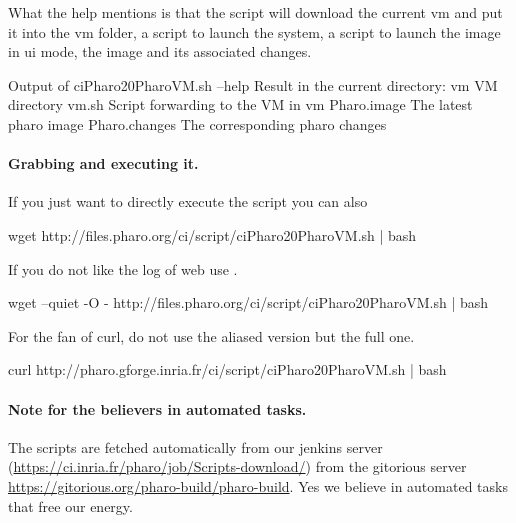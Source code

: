 \documentclass[a4paper,10pt,twoside]{book}
\begin{document}
What the help mentions is that the script will download the current vm and put it into the vm folder,  a script to launch the system, 
 a script to launch the image in ui mode, the image and its associated changes. 

\begin{code}{Output of ciPharo20PharoVM.sh --help }
Result in the current directory:
    vm                        VM directory
    vm.sh                   Script forwarding to the VM in vm
    Pharo.image        The latest pharo image
    Pharo.changes    The corresponding pharo changes
\end{code}


\paragraph{Grabbing and executing it.}
If you just want to directly execute the script you can also 


\begin{code}{}
wget http://files.pharo.org/ci/script/ciPharo20PharoVM.sh | bash
\end{code}

If you do not like the log of web use .

\begin{code}{}
wget --quiet -O - http://files.pharo.org/ci/script/ciPharo20PharoVM.sh | bash
\end{code}

For the fan of curl, do not use the aliased version but the full one.
\begin{code}{}
curl http://pharo.gforge.inria.fr/ci/script/ciPharo20PharoVM.sh | bash
\end{code}


\paragraph{Note for the believers in automated tasks.} The scripts are fetched automatically from 
our jenkins server (\url{https://ci.inria.fr/pharo/job/Scripts-download/}) from the gitorious server \url{https://gitorious.org/pharo-build/pharo-build}.
Yes we believe in automated tasks that free our energy. 
\end{document}
